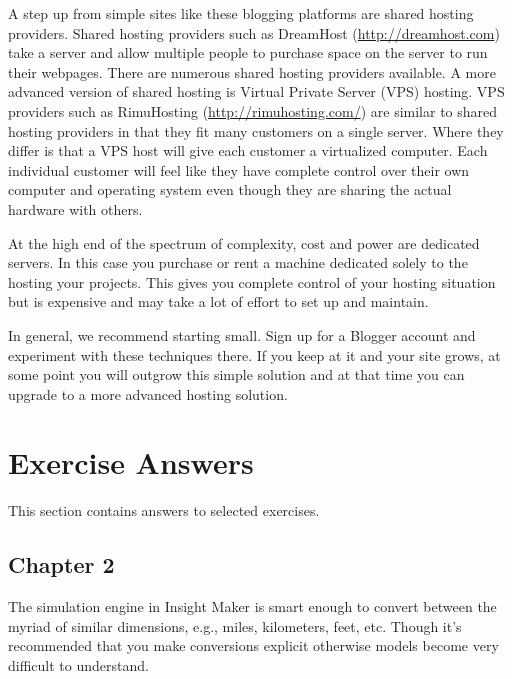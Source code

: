 \documentclass[]{memoir}
\begin{document}
A step up from simple sites like these blogging platforms are shared
hosting providers. Shared hosting providers such as DreamHost
(\url{http://dreamhost.com}) take a server and allow multiple people to
purchase space on the server to run their webpages. There are numerous
shared hosting providers available. A more advanced version of shared
hosting is Virtual Private Server (VPS) hosting. VPS providers such as
RimuHosting (\url{http://rimuhosting.com/}) are similar to shared
hosting providers in that they fit many customers on a single server.
Where they differ is that a VPS host will give each customer a
virtualized computer. Each individual customer will feel like they have
complete control over their own computer and operating system even
though they are sharing the actual hardware with others.

At the high end of the spectrum of complexity, cost and power are
dedicated servers. In this case you purchase or rent a machine dedicated
solely to the hosting your projects. This gives you complete control of
your hosting situation but is expensive and may take a lot of effort to
set up and maintain.

In general, we recommend starting small. Sign up for a Blogger account
and experiment with these techniques there. If you keep at it and your
site grows, at some point you will outgrow this simple solution and at
that time you can upgrade to a more advanced hosting solution.

\chapter{Exercise Answers}

This section contains answers to selected exercises.

\section{Chapter 2}


The simulation engine in Insight Maker is smart enough to convert
between the myriad of similar dimensions, e.g., miles, kilometers, feet,
etc. Though it's recommended that you make conversions explicit
otherwise models become very difficult to understand.
\end{document}
